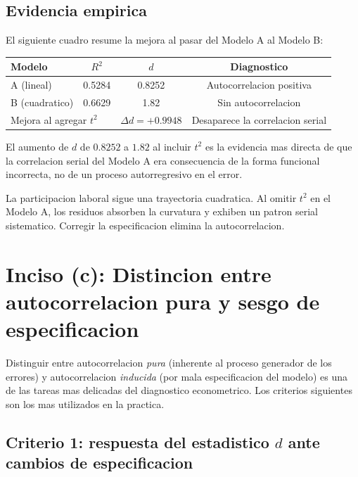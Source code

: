 \documentclass[12pt, letterpaper]{article}
\begin{document}
\subsection{Evidencia empirica}

El siguiente cuadro resume la mejora al pasar del Modelo A al Modelo B:

\begin{center}
\renewcommand{\arraystretch}{1.3}
\small
\begin{tabular}{lccc}
\toprule
\textbf{Modelo} & $R^2$ & $d$ & \textbf{Diagnostico} \\
\midrule
A (lineal)    & 0.5284 & 0.8252 & Autocorrelacion positiva \\
B (cuadratico)& 0.6629 & 1.82   & Sin autocorrelacion \\
\midrule
\multicolumn{2}{l}{Mejora al agregar $t^2$}
  & $\Delta d = +0.9948$ & Desaparece la correlacion serial \\
\bottomrule
\end{tabular}
\end{center}

El aumento de $d$ de $0.8252$ a $1.82$ al incluir $t^2$ es la evidencia
mas directa de que la correlacion serial del Modelo A era consecuencia de la
forma funcional incorrecta, no de un proceso autorregresivo en el error.

\begin{clave}
  La participacion laboral sigue una trayectoria cuadratica. Al omitir $t^2$
  en el Modelo A, los residuos absorben la curvatura y exhiben un patron
  serial sistematico. Corregir la especificacion elimina la autocorrelacion.
\end{clave}

\section{Inciso (c): Distincion entre autocorrelacion pura y sesgo de especificacion}

Distinguir entre autocorrelacion \emph{pura} (inherente al proceso generador
de los errores) y autocorrelacion \emph{inducida} (por mala especificacion del
modelo) es una de las tareas mas delicadas del diagnostico econometrico. Los
criterios siguientes son los mas utilizados en la practica.

\subsection{Criterio 1: respuesta del estadistico $d$ ante cambios de especificacion}
\end{document}
